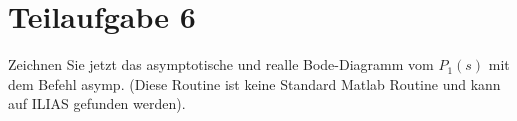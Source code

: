 \section{Teilaufgabe 6}
\begin{aufgabe}
    Zeichnen Sie jetzt das asymptotische und realle Bode-Diagramm vom $P_1(s)$ 
    mit dem Befehl asymp. (Diese Routine ist keine Standard Matlab Routine und 
    kann auf ILIAS gefunden werden).
\end{aufgabe}
